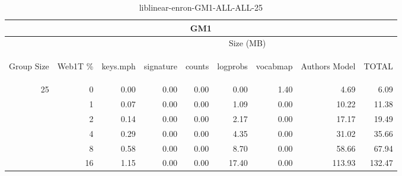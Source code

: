 \begin{center}
\begin{table}[htbp] 
 \begin{center}
\begin{tabular}{ | r | r | r | r | r | r | r | r | r |}
\hline
\multicolumn{9}{|c|}{GM1}\\
\hline
 & & \multicolumn{7}{|c|}{Size (MB)}\\ \cline{3-9}
\begin{sideways}Group Size\end{sideways} & \begin{sideways}Web1T \% \end{sideways} & \begin{sideways}keys.mph\end{sideways} & \begin{sideways}signature\end{sideways} & \begin{sideways}counts\end{sideways} & \begin{sideways}logprobs\end{sideways} & \begin{sideways}vocabmap\end{sideways} & \begin{sideways}Authors Model \end{sideways} & \begin{sideways}TOTAL\end{sideways}\\
\hline
\multirow{5}{*}{25}
 & 0 & 0.00 & 0.00 & 0.00 & 0.00 & 1.40 & 4.69 & 6.09\\ \cline{2-9}
 & 1 & 0.07 & 0.00 & 0.00 & 1.09 & 0.00 & 10.22 & 11.38\\ \cline{2-9}
 & 2 & 0.14 & 0.00 & 0.00 & 2.17 & 0.00 & 17.17 & 19.49\\ \cline{2-9}
 & 4 & 0.29 & 0.00 & 0.00 & 4.35 & 0.00 & 31.02 & 35.66\\ \cline{2-9}
 & 8 & 0.58 & 0.00 & 0.00 & 8.70 & 0.00 & 58.66 & 67.94\\ \cline{2-9}
 & 16 & 1.15 & 0.00 & 0.00 & 17.40 & 0.00 & 113.93 & 132.47\\ \cline{2-9}
\hline
\end{tabular}
\caption{liblinear-enron-GM1-ALL-ALL-25}
\label{table:liblinear-enron-GM1-ALL-ALL-25}
\end{center}
 \end{table}
\end{center}

